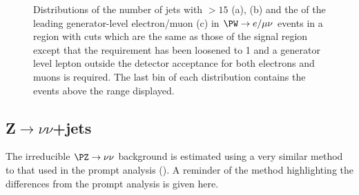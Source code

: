 \begin{figure}
  \caption{Distributions of the number of jets with \pt$>15$ \GeV (a), \jetmetdphi (b) and the \pt of the leading generator-level electron/muon (c) in $\PW\rightarrow e/\mu\nu$ events in a region with cuts which are the same as those of the signal region except that the \jetmetdphi requirement has been loosened to 1 and a generator level lepton outside the detector acceptance for both electrons and muons is required. The last bin of each distribution contains the events above the range displayed.}
  \label{fig:enumunudiff}
\end{figure}

\subsection{Z$\rightarrow \nu\nu$+jets}
\label{sec:parkedznunu}
The irreducible $\PZ\rightarrow\nu\nu$ background is estimated using a very similar method to that used in the prompt analysis (). A reminder of the method highlighting the differences from the prompt analysis is given here.

